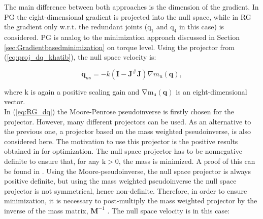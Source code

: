 The main difference between both approaches is the dimension of the gradient.  In PG the eight-dimensional gradient is projected into the null space, while in RG the gradient only w.r.t. the redundant joints ($\mathrm{q_1}$ and $\mathrm{q_4}$ in this case) is considered.
PG is analog to the minimization approach discussed in Section \ref{sec:Gradientbasedminimization} on torque level. Using the projector from (\ref{eq:proj_dq_khatib}), the null space velocity is:


\begin{equation}
\mathbf{\dot{q}}_{ns} =  - k (\mathbf{I} -  \mathbf{J}^{\#} \mathbf{J} ) \nabla m_u(\mathbf{q}), \label{eq:RG_dq}
\end{equation}

where  $\mathrm{k}$ is again a positive scaling gain and $\mathrm{\nabla m_u(\mathbf{q})}$ is an eight-dimensional vector.\\
%
%
%
%
%
In (\ref{eq:RG_dq}) the Moore-Penrose pseudoinverse is firstly chosen for the projector. 
However, many different projectors can be used. As an alternative to the previous one, a projector based on the mass weighted pseudoinverse, is also considered here. The motivation to use this projector is the positive results obtained in \cite{Nemec_2} for optimization. The null space projector has to be nonnegative definite to ensure that, for any $\mathrm{k > 0}$, the mass is minimized. A proof of this can be found in \cite{yoshikawa}. Using the Moore-pseudoinverse, the null space projector is always positive definite, but using the mass weighted pseudoinverse the null space projector is not symmetrical, hence non-definite. Therefore, in order to ensure minimization, it is necessary to post-multiply the mass weighted projector by the inverse of the mass matrix, $\mathbf{M}^{-1}$  \cite{Nemec}. The null space velocity is in this case: 

